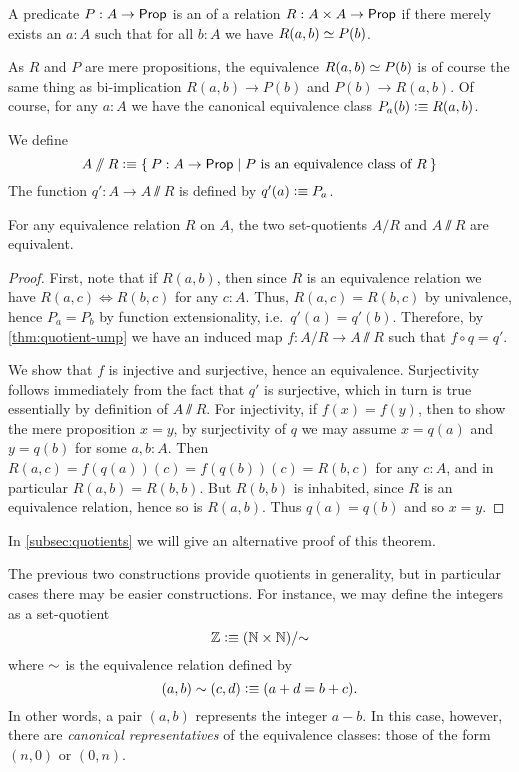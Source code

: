 \begin{defn}
  A predicate $P:A\to\mathsf{Prop}$ is an 
  of a relation $R : A \times A \to \mathsf{Prop}$ if there merely exists an $a:A$ such that for all $b:A$ we have $R(a,b) \simeq P(b)$.
\end{defn}

As $R$ and $P$ are mere propositions, the equivalence $R(a,b) \simeq P(b)$ is of course the same thing as bi-implication $R(a,b) \to P(b)$ and $P(b) \to R(a,b)$.
Of course, for any $a:A$ we have the canonical equivalence class $P_a(b) \vcentcolon\equiv R(a,b)$.

\begin{defn}\label{def:VVquotient}
  We define
  \begin{equation*}
    A\sslash R \defeq \setof{ P:A\to\prop | P \text{ is an equivalence class of } R}
  \end{equation*}
  The function $q':A\to A\sslash R$ is defined by $q'(a) \vcentcolon\equiv P_a$.
\end{defn}

\begin{thm}
  For any equivalence relation $R$ on $A$, the two set-quotients $A/R$ and $A\sslash R$ are equivalent.
\end{thm}
\begin{proof}
  First, note that if $R(a,b)$, then since $R$ is an equivalence relation we have $R(a,c) \Leftrightarrow R(b,c)$ for any $c:A$.
  Thus, $R(a,c) = R(b,c)$ by univalence, hence $P_a=P_b$ by function extensionality, i.e.\ $q'(a)=q'(b)$.
  Therefore, by \autoref{thm:quotient-ump} we have an induced map $f:A/R \to A\sslash R$ such that $f\circ q = q'$.

  We show that $f$ is injective and surjective, hence an equivalence.
  Surjectivity follows immediately from the fact that $q'$ is surjective, which in turn is true essentially by definition of $A\sslash R$.
  For injectivity, if $f(x)=f(y)$, then to show the mere proposition $x=y$, by surjectivity of $q$ we may assume $x=q(a)$ and $y=q(b)$ for some $a,b:A$.
  Then $R(a,c) = f(q(a))(c) = f(q(b))(c) = R(b,c)$ for any $c:A$, and in particular $R(a,b) = R(b,b)$.
  But $R(b,b)$ is inhabited, since $R$ is an equivalence relation, hence so is $R(a,b)$.
  Thus $q(a)=q(b)$ and so $x=y$.
\end{proof}

In \autoref{subsec:quotients} we will give an alternative proof of this theorem.

\begin{rmk}\label{defn-Z}
The previous two constructions provide quotients in generality, but in particular cases there may be easier constructions.
For instance, we may define the integers \Z as a set-quotient
%
%
%
\[ \mathbb{Z} \vcentcolon\equiv (\mathbb{N} \times \mathbb{N})/{\sim} \]
%
where $\sim$ is the equivalence relation defined by
%
\[ (a,b) \sim (c,d) \vcentcolon\equiv (a + d = b + c). \]
%
In other words, a pair $(a,b)$ represents the integer $a - b$.
In this case, however, there are \emph{canonical representatives} of the equivalence classes: those of the form $(n,0)$ or $(0,n)$.
\end{rmk}

